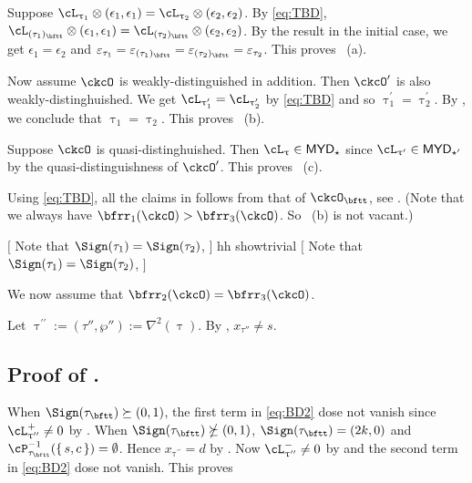 \documentclass[12pt,a4paper]{amsart}
\newcommand{\trivial}[2][]{\if\relax\detokenize{#1}\relax
  {%
      \color{orange} \vspace{0em} $[$  #2 $]$
      \color{black}
  }
  \else
\ifx#1h
\ifcsname showtrivial\endcsname
{%
    \color{orange} \vspace{0em}  $[$ #2 $]$
    \color{black}
}
\fi
\else {\red Wrong argument!} \fi
\fi
}
\newcommand{\AC}{\mathrm{AC}}
\def\MYD{{\mathsf{MYD}}}
\def\pac#1{\ac_{#1}^+}
\def\nac#1{\ac_{#1}^-}
\def\AC{\mathrm{AC}}
\def\DD{\nabla}
\numberwithin{equation}{section}
\theoremstyle{remark}
\def\uptaup{\uptau^{\prime}}
\def\uptaupp{\uptau^{\prime\prime}}
\begin{document}
Suppose $\ac_{\uptau_1}\lotimes (\epsilon_{1},\epsilon_{1})
= \ac_{\uptau_2}\lotimes( \epsilon_{2},\epsilon_{2} )$.
By \eqref{eq:TBD},
$\cL_{(\tau_{1})_{\bftt}}\lotimes(\epsilon_{1},\epsilon_{1}) =
\cL_{(\tau_{2})_{\bftt}}\lotimes(\epsilon_{2},\epsilon_{2})$.
By the result in the initial case, we get $\epsilon_{1}=\epsilon_{2}$ and
$\varepsilon_{\tau_{1}}=\varepsilon_{(\tau_{1})_{\bftt}}=\varepsilon_{(\tau_{2})_{\bftt}}=\varepsilon_{\tau_{2}}$.
This proves ~(a).

\smallskip

Now assume $\ckcO$ is weakly-distinguished in addition. Then $\ckcO'$ is also
weakly-distinghuished.
We get $\ac_{\uptaup_{1}}=\ac_{\uptaup_{2}}$ by \eqref{eq:TBD} and so $\uptaup_{1}=\uptaup_{2}$.
By , we conclude that $\uptau_{1}=\uptau_{2}$. This proves
~(b).


\smallskip

Suppose $\ckcO$ is quasi-distinghuished. Then $\ac_{\uptau}\in \MYD_{\star}$
since $\ac_{\uptau'}\in \MYD_{\star'}$ by the quasi-distinguishness of
$\ckcO'$.
This proves ~(c).


\smallskip

Using \eqref{eq:TBD}, all the claims in  follows from that of
$\ckcO_{\bftt}$, see . (Note that we always have
$\bfrr_{1}(\ckcO)>\bfrr_{3}(\ckcO)$. So ~(b) is not vacant.)

\trivial[h]{
Note that $\Sign(\tau_{1})=\Sign(\tau_{2})$,
}

\medskip


We now assume that $\bfrr_{2}(\ckcO)=\bfrr_{3}(\ckcO)$.

Let $\uptaupp :=(\tau'',\wp''):= \DD^{2}(\uptau)$.
By , $x_{\tau''}\neq s$.


\subsection*{\bf Proof of . }
When $\Sign(\tau_{\bftt})\succeq (0,1)$, the first term in \eqref{eq:BD2} dose
not vanish since $\pac{\uptaupp}\neq 0$ by .
When $\Sign(\tau_{\bftt})\nsucceq (0,1)$, $\Sign(\tau_{\bftt}) = (2k,0)$ and
$\cP_{\tau_{\bftt}}^{-1}(\set{s,c})=\emptyset$. Hence
  $x_{\uptaupp}=d$ by . Now $\nac{\uptaupp} \neq 0$ by
   and
  the second term in \eqref{eq:BD2} dose not vanish.
This proves 
\end{document}
